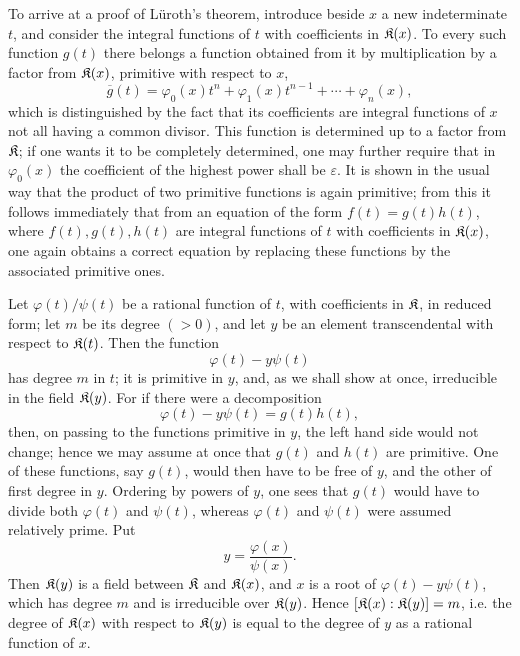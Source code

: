 To arrive at a proof of Lüroth's theorem, introduce beside \(x\) a new indeterminate \(t\), and consider the integral functions of \(t\) with coefficients in \(\mathfrak K(x)\). To every such function \(g(t)\) there belongs a function obtained from it by multiplication by a factor from \(\mathfrak K(x)\), primitive with respect to \(x\),
\[
\overline g(t)=\varphi_0(x)t^n+\varphi_1(x)t^{n-1}+\cdots+\varphi_n(x),
\]
which is distinguished by the fact that its coefficients are integral functions of \(x\) not all having a common divisor. This function is determined up to a factor from \(\mathfrak K\); if one wants it to be completely determined, one may further require that in \(\varphi_0(x)\) the coefficient of the highest power shall be \(\varepsilon\). It is shown in the usual way that the product of two primitive functions is again primitive; from this it follows immediately that from an equation of the form \(f(t)=g(t)h(t)\), where \(f(t),g(t),h(t)\) are integral functions of \(t\) with coefficients in \(\mathfrak K(x)\), one again obtains a correct equation by replacing these functions by the associated primitive ones.

Let \(\varphi(t)/\psi(t)\) be a rational function of \(t\), with coefficients in \(\mathfrak K\), in reduced form; let \(m\) be its degree \((>0)\), and let \(y\) be an element transcendental with respect to \(\mathfrak K(t)\). Then the function
\[
\varphi(t)-y\psi(t)
\]
has degree \(m\) in \(t\); it is primitive in \(y\), and, as we shall show at once, irreducible in the field \(\mathfrak K(y)\). For if there were a decomposition
\[
\varphi(t)-y\psi(t)=g(t)h(t),
\]
then, on passing to the functions primitive in \(y\), the left hand side would not change; hence we may assume at once that \(g(t)\) and \(h(t)\) are primitive. One of these functions, say \(g(t)\), would then have to be free of \(y\), and the other of first degree in \(y\). Ordering by powers of \(y\), one sees that \(g(t)\) would have to divide both \(\varphi(t)\) and \(\psi(t)\), whereas \(\varphi(t)\) and \(\psi(t)\) were assumed relatively prime. Put
\[
y=\frac{\varphi(x)}{\psi(x)}.
\]
Then \(\mathfrak K(y)\) is a field between \(\mathfrak K\) and \(\mathfrak K(x)\), and \(x\) is a root of \(\varphi(t)-y\psi(t)\), which has degree \(m\) and is irreducible over \(\mathfrak K(y)\). Hence \([\mathfrak K(x):\mathfrak K(y)]=m\), i.e. the degree of \(\mathfrak K(x)\) with respect to \(\mathfrak K(y)\) is equal to the degree of \(y\) as a rational function of \(x\).

